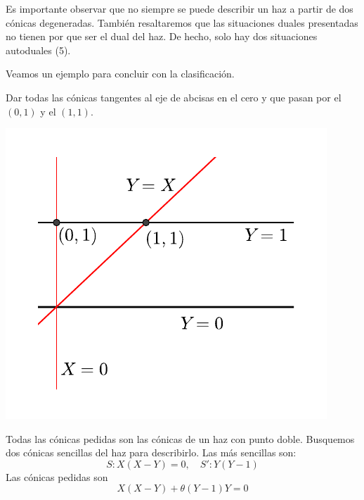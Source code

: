 \\

\\

\\

\\

\\

\\

\\

\\

\\

\\

Es importante observar que no siempre se puede describir un haz a partir de dos cónicas degeneradas. También resaltaremos que las situaciones duales presentadas no tienen por que ser el dual del haz. De hecho, solo hay dos situaciones autoduales (5).

Veamos un ejemplo para concluir con la clasificación.
\begin{exa}
	Dar todas las cónicas tangentes al eje de abcisas en el cero y que pasan por el $(0,1)$ y el $(1,1)$.
	\begin{center}
		\includegraphics[scale=.8]{Graficos/Conicas/Ejemplohaz}
	\end{center}
	Todas las cónicas pedidas son las cónicas de un haz con punto doble. Busquemos dos cónicas sencillas del haz para describirlo. Las más sencillas son:
	\[S:X(X-Y)=0, \quad S':Y(Y-1)\]
	Las cónicas pedidas son
	\[X(X-Y)+\theta(Y-1)Y=0\]
\end{exa}

